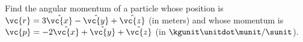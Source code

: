 Find the angular momentum of a particle whose position is
$\vc{r}=3\hat{\vc{x}}-\hat{\vc{y}}+\hat{\vc{z}}$ (in meters) and
whose momentum is $\vc{p}=-2\hat{\vc{x}}+\hat{\vc{y}}+\hat{\vc{z}}$ 
(in $\kgunit\unitdot\munit/\sunit$).
\answercheck

